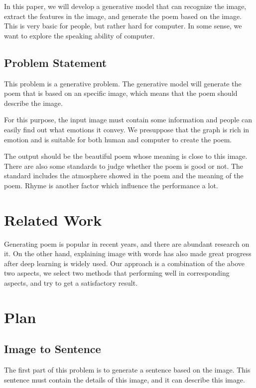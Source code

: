 \documentclass[10pt,twocolumn,letterpaper]{article}
\begin{document}
In this paper, we will develop a generative model that can recognize the image, extract the features in the image, and generate the poem based on the image. This is very basic for people, but rather hard for computer. In some sense, we want to explore the speaking ability of computer.
\subsection{Problem Statement}
This problem is a generative problem. The generative model will generate the poem that is based on an specific image, which means that the poem should describe the image. 

For this purpose, the input image must contain some information and people can easily find out what emotions it convey. We presuppose that the graph is rich in emotion and is suitable for both human and computer to create the poem.

The output should be the beautiful poem whose meaning is close to this image. There are also some standards to judge whether the poem is good or not. The standard includes the atmosphere showed in the poem and the meaning of the poem. Rhyme is another factor which influence the performance a lot.


\section{Related Work}
	Generating poem is popular in recent years, and there are abundant research on it. On the other hand, explaining image with words has also made great progress after deep learning is widely used. Our approach is a combination of the above two aspects, we select two methods that performing well in corresponding aspects, and try to get a satisfactory result.
\section{Plan}
\subsection{Image to Sentence}
The first part of this problem is to generate a sentence based on the image. This sentence must contain the details of this image, and it can describe this image.
\end{document}
